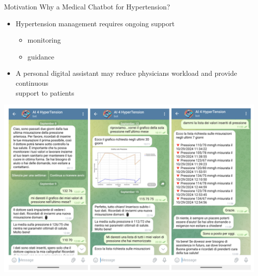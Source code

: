 \documentclass[handout]{beamer}\mode<handout>{\usetheme{AMSBolognaFC}}
\begin{document}
\begin{frame}[c]{Motivation}
    Why a Medical Chatbot for Hypertension?~
    \vspace{1em}
    \begin{itemize}
        \item Hypertension management requires ongoing support
        \begin{itemize}
            \item \alert{monitoring}
            \item \alert{guidance}
        \end{itemize}
        \item A personal digital assistant may reduce physicians workload and provide continuous \\ support to patients
        \end{itemize}
        
 \vspace{-2.5em}
    \raggedleft
    \includegraphics[width=.65\textwidth]{figures/chatbot}
    \vfill

\end{frame}
\end{document}
